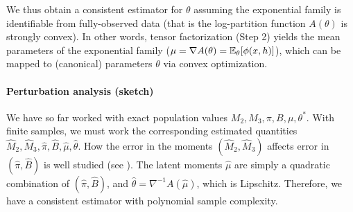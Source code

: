 We thus obtain a consistent estimator for $\theta$ assuming the exponential
family is identifiable from fully-observed data (that is
the log-partition function $A(\theta)$ is strongly convex).
In other words,
tensor factorization (Step 2) yields the mean parameters of the exponential family
($\mu = \nabla A(\theta) = \mathbb{E}_\theta[\phi(x, h)]$),
which can be mapped to (canonical) parameters $\theta$ via convex optimization.

\paragraph{Perturbation analysis (sketch)}
We have so far worked with exact population values $M_2,M_3,\pi,B,\mu,\theta^*$.
With finite samples, we must work the corresponding estimated quantities $\hat M_2,\hat M_3,\hat\pi,\hat B,\hat\mu,\hat\theta$.
How the error in the moments $(\hat M_2,\hat M_3)$ affects error in $(\hat\pi,\hat B)$ is well studied
(see \citet{anandkumar12moments,anandkumar13tensor}).
The latent moments $\hat\mu$ are simply a quadratic combination of $(\hat\pi,\hat B)$,
and $\hat\theta = \nabla^{-1} A(\hat\mu)$, which is Lipschitz.
Therefore, we have a consistent estimator with polynomial sample complexity.
